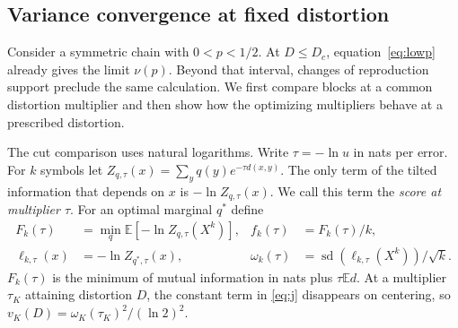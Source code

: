 \documentclass[11pt,letterpaper]{article}
\theoremstyle{definition}
\newcommand{\E}{\mathbb E}
\newcommand{\sd}{\operatorname{sd}}
\begin{document}
\subsection{Variance convergence at fixed distortion}\label{sec:variance}
Consider a symmetric chain with $0<p<1/2$. At $D\le D_c$, equation~\eqref{eq:lowp} already gives the limit $\nu(p)$. Beyond that interval, changes of reproduction support preclude the same calculation. We first compare blocks at a common distortion multiplier and then show how the optimizing multipliers behave at a prescribed distortion.

The cut comparison uses natural logarithms. Write $\tau=-\ln u$ in nats per error. For $k$ symbols let $Z_{q,\tau}(x)=\sum_y q(y)e^{-\tau d(x,y)}$. The only term of the tilted information that depends on $x$ is $-\ln Z_{q,\tau}(x)$. We call this term the \emph{score at multiplier $\tau$}. For an optimal marginal $q^*$ define
\begin{equation}
 \begin{aligned}
 F_k(\tau)&=\min_q\E[-\ln Z_{q,\tau}(X^k)],& f_k(\tau)&=F_k(\tau)/k,\\
 \ell_{k,\tau}(x)&=-\ln Z_{q^*,\tau}(x),& \omega_k(\tau)&=\sd(\ell_{k,\tau}(X^k))/\sqrt{k}.
 \end{aligned}                                                    \label{eq:canon}
\end{equation}
$F_k(\tau)$ is the minimum of mutual information in nats plus $\tau\E d$. At a multiplier $\tau_K$ attaining distortion $D$, the constant term in \eqref{eq:j} disappears on centering, so $v_K(D)=\omega_K(\tau_K)^2/(\ln2)^2$.
\end{document}

